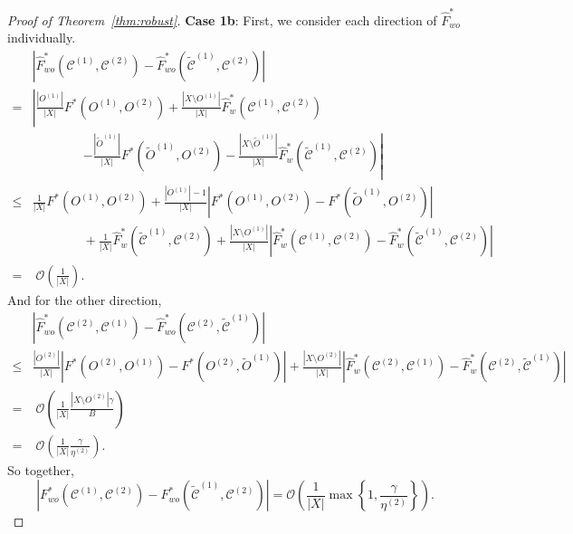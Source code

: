 \documentclass[review,los,12pt]{ryethesis}
\newcommand\cCone{\mathcal{C}^{(1)}}
\newcommand\tcCone{\tilde{\mathcal{C}}^{(1)}}
\newcommand\cCtwo{\mathcal{C}^{(2)}}
\newcommand{\bigO}{\mathcal{O}}
\begin{document}
\begin{proof}[Proof of Theorem~\ref{thm:robust}]
    \textbf{Case 1b}:
    First, we consider each direction of $\hat{F}^*_{wo}$ individually.     
    \begin{align*}
        & \left| \hat{F}^*_{wo}(\cCone, \cCtwo) - \hat{F}^*_{wo}(\tcCone, \cCtwo) \right| \\
        = & \left| \frac{|O^{(1)}|}{|X|}F^*(O^{(1)}, O^{(2)}) + \frac{|X \setminus O^{(1)}|}{|X|}\hat{F}^*_w(\cCone, \cCtwo) \right. \\
        & \qquad \qquad \left. - \frac{|\tilde{O}^{(1)}|}{|X|}F^*(\tilde{O}^{(1)}, O^{(2)}) - \frac{|X \setminus \tilde{O}^{(1)}|}{|X|}\hat{F}^*_w(\tcCone, \cCtwo) \right| \\
        \leq & \frac{1}{|X|}F^*(O^{(1)}, O^{(2)}) + \frac{|O^{(1)}|-1}{|X|}\left|F^*(O^{(1)}, O^{(2)}) - F^*(\tilde{O}^{(1)}, O^{(2)})\right| \\
        & \qquad \qquad + \frac{1}{|X|}\hat{F}^*_w(\tcCone, \cCtwo) + \frac{|X \setminus O^{(1)}|}{|X|} \left|\hat{F}^*_w(\cCone, \cCtwo) - \hat{F}^*_w(\tcCone, \cCtwo) \right| \\
        = & \; \bigO \left( \frac{1}{|X|} \right).
    \end{align*}
    And for the other direction,
    \begin{align*}
        & \left| \hat{F}^*_{wo}(\cCtwo, \cCone) - \hat{F}^*_{wo}(\cCtwo, \tcCone) \right| \\
        \leq & \frac{|O^{(2)}|}{|X|}\left| F^*(O^{(2)}, O^{(1)}) - F^*(O^{(2)}, \tilde{O}^{(1)})\right| + \frac{|X \setminus O^{(2)}|}{|X|}\left| \hat{F}^*_w(\cCtwo, \cCone) - \hat{F}^*_w(\cCtwo, \tcCone)\right|\\
        = & \; \bigO \left( \frac{1}{|X|} \frac{|X \setminus O^{(2)}| \gamma}{B}\right) \\
        = & \; \bigO \left( \frac{1}{|X|} \frac{\gamma}{\eta^{(2)}}\right).
    \end{align*}
    So together,
    \begin{equation*}
        \left| F^*_{wo}(\cCone, \cCtwo) - F^*_{wo}(\tcCone, \cCtwo) \right| = \bigO \left( \frac{1}{|X|} \max \left\{ 1, \frac{\gamma}{\eta^{(2)}} \right\} \right).
    \end{equation*}


\end{proof}
\end{document}
